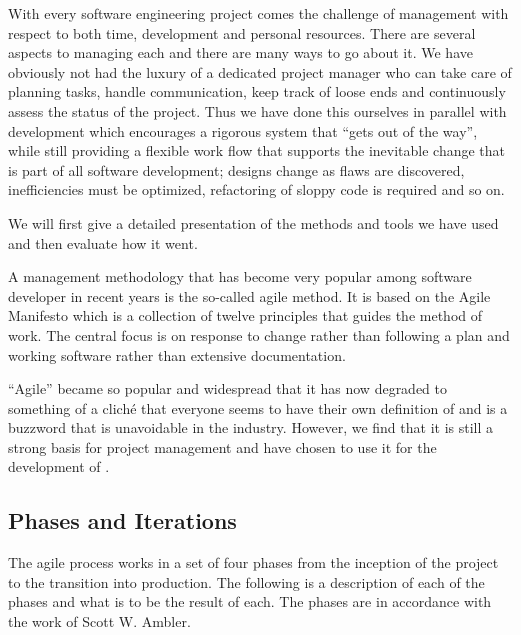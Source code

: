 With every software engineering project comes the challenge of management with
respect to both time, development and personal resources. There are several
aspects to managing each and there are many ways to go about it. We have
obviously not had the luxury of a dedicated project manager who can take care of
planning tasks, handle communication, keep track of loose ends and continuously
assess the status of the project. Thus we have done this ourselves in parallel
with development which encourages a rigorous system that ``gets out of the
way'', while still providing a flexible work flow that supports the inevitable
change that is part of all software development; designs change as flaws are
discovered, inefficiencies must be optimized, refactoring of sloppy code is
required and so on.

We will first give a detailed presentation of the methods and tools we have used
and then evaluate how it went.

A management methodology that has become very popular among software developer
in recent years is the so-called agile method. It is based on the Agile
Manifesto\cite{agile-manifesto} which is a collection of twelve principles that
guides the method of work. The central focus is on response to change rather
than following a plan and working software rather than extensive documentation.

``Agile'' became so popular and widespread that it has now degraded to something
of a clich\'e that everyone seems to have their own definition of and is a
buzzword that is unavoidable in the industry. However, we find that it is still
a strong basis for project management and have chosen to use it for the
development of \thename{}.

\subsection{Phases and Iterations}
\label{sec:project-mgmt:phases}

The agile process works in a set of four phases from the inception of the
project to the transition into production. The following is a description of
each of the phases and what is to be the result of each. The phases are in
accordance with the work of Scott W. Ambler\cite{aup}.

